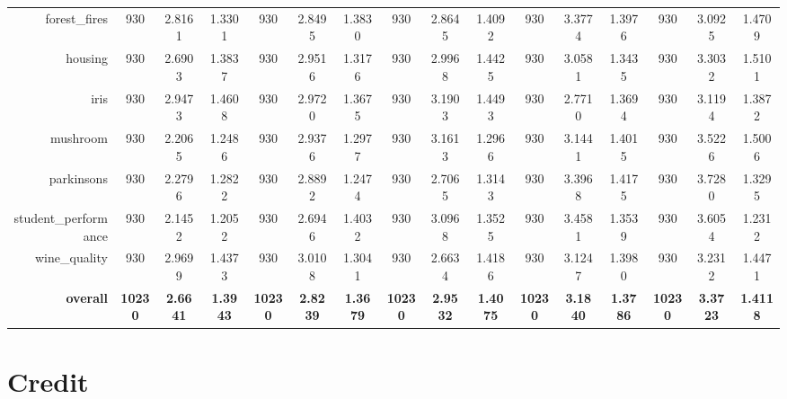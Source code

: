 \begin{table}[htbp]
{\begin{tabular}{rccccccccccccccc}
    forest\_fires & 930   & \cellcolor[rgb]{ .776,  .937,  .808}\textcolor[rgb]{ 0,  .38,  0}{2.8161} & 1.3301 & 930   & 2.8495 & 1.3830 & 930   & 2.8645 & 1.4092 & 930   & 3.3774 & 1.3976 & 930   & 3.0925 & 1.4709 \\
    housing & 930   & \cellcolor[rgb]{ .776,  .937,  .808}\textcolor[rgb]{ 0,  .38,  0}{2.6903} & 1.3837 & 930   & 2.9516 & 1.3176 & 930   & 2.9968 & 1.4425 & 930   & 3.0581 & 1.3435 & 930   & 3.3032 & 1.5101 \\
    iris  & 930   & 2.9473 & 1.4608 & 930   & 2.9720 & 1.3675 & 930   & 3.1903 & 1.4493 & 930   & \cellcolor[rgb]{ .776,  .937,  .808}\textcolor[rgb]{ 0,  .38,  0}{2.7710} & 1.3694 & 930   & 3.1194 & 1.3872 \\
    mushroom & 930   & \cellcolor[rgb]{ .776,  .937,  .808}\textcolor[rgb]{ 0,  .38,  0}{2.2065} & 1.2486 & 930   & 2.9376 & 1.2977 & 930   & 3.1613 & 1.2966 & 930   & 3.1441 & 1.4015 & 930   & 3.5226 & 1.5006 \\
    parkinsons & 930   & \cellcolor[rgb]{ .776,  .937,  .808}\textcolor[rgb]{ 0,  .38,  0}{2.2796} & 1.2822 & 930   & 2.8892 & 1.2474 & 930   & 2.7065 & 1.3143 & 930   & 3.3968 & 1.4175 & 930   & 3.7280 & 1.3295 \\
    student\_performance & 930   & \cellcolor[rgb]{ .776,  .937,  .808}\textcolor[rgb]{ 0,  .38,  0}{2.1452} & 1.2052 & 930   & 2.6946 & 1.4032 & 930   & 3.0968 & 1.3525 & 930   & 3.4581 & 1.3539 & 930   & 3.6054 & 1.2312 \\
    wine\_quality & 930   & 2.9699 & 1.4373 & 930   & 3.0108 & 1.3041 & 930   & \cellcolor[rgb]{ .776,  .937,  .808}\textcolor[rgb]{ 0,  .38,  0}{2.6634} & 1.4186 & 930   & 3.1247 & 1.3980 & 930   & 3.2312 & 1.4471 \\
    \midrule
    \textbf{overall} & \textbf{10230} & \cellcolor[rgb]{ .776,  .937,  .808}\textcolor[rgb]{ 0,  .38,  0}{\textbf{2.6641}} & \textbf{1.3943} & \textbf{10230} & \textbf{2.8239} & \textbf{1.3679} & \textbf{10230} & \textbf{2.9532} & \textbf{1.4075} & \textbf{10230} & \textbf{3.1840} & \textbf{1.3786} & \textbf{10230} & \textbf{3.3723} & \textbf{1.4118} \\
    \end{tabular}%
    }
  \label{tab:results:bhh_burn_in_metrics}%
\end{table}%


\section{Credit}
\label{sec:results:bhh_credit}

